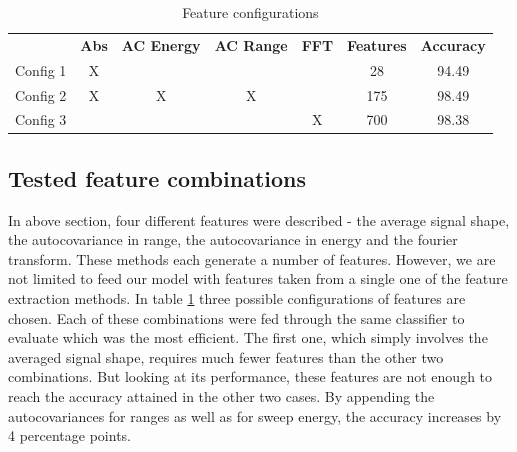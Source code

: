 


\begin{table}
\label{tab:feat}
\begin{center}
  \begin{tabular}{|c|cccccc|}
\hline
    \rowcolor{gray!150}
		  & \color{white}\textbf{Abs} & \color{white}\textbf{AC Energy} & \color{white}\textbf{AC Range} & \color{white}\textbf{FFT} & \color{white}\textbf{Features} & \color{white}\textbf{Accuracy} \\
	  Config 1 & X &   &   &   & 28  & 94.49 \\
	  Config 2 & X & X & X & & 175 & 98.49 \\
	  Config 3 & & & & X & 700 & 98.38 \\
\hline
  \end{tabular}
\end{center}
\caption{Feature configurations}
\end{table}


\subsection{Tested feature combinations}

In above section, four different features were described - the average signal shape, the autocovariance in range, the autocovariance in energy and the fourier transform. These methods each generate a number of features. However, we are not limited to feed our model with features taken from a single one of the feature extraction methods. In table \ref{tab:feat} three possible configurations of features are chosen. Each of these combinations were fed through the same classifier to evaluate which was the most efficient. The first one, which simply involves the averaged signal shape, requires much fewer features than the other two combinations. But looking at its performance, these features are not enough to reach the accuracy attained in the other two cases. By appending the autocovariances for ranges as well as for sweep energy, the accuracy increases by 4 percentage points. 

